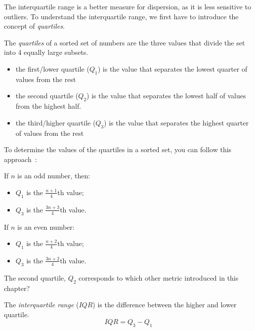 The interquartile range is a better measure for dispersion, as it is less sensitive to outliers.
To understand the interquartile range, we first have to introduce the concept of \emph{quartiles}.

\begin{definition}[Quartiles]
    The \emph{quartiles} of a sorted set of numbers are the three values that divide the set into 4 equally large subsets.
    
    \begin{itemize}
        \item the first/lower quartile ($Q_{1}$) is the value that separates the lowest quarter of values from the rest
        \item the second quartile ($Q_{2}$) is the value that separates the lowest half of values from the highest half.
        \item the third/higher quartile ($Q_{3}$) is the value that separates the highest quarter of values from the rest
    \end{itemize}
\end{definition}

To determine the values of the quartiles in a sorted set, you can follow this approach~\autocite{Moore2002}:

If $n$ is an odd number, then:
\begin{itemize}
    \item $Q_{1}$ is the $\frac{n+1}{4}$th value;
    \item $Q_{3}$ is the $\frac{3n+3}{4}$th value.
\end{itemize}

If $n$ is an even number:
\begin{itemize}
    \item $Q_{1}$ is the $\frac{n+2}{4}$th value;
    \item $Q_{3}$ is the $\frac{3n+2}{4}$th value.
\end{itemize}

\begin{exercise}
    The second quartile, $Q_2$ corresponds to which other metric introduced in this chapter?
\end{exercise}

\begin{definition}
    The \emph{interquartile range} ($IQR$) is the difference between the higher and lower quartile.
    \begin{equation}
    IQR = Q_3 - Q_1
    \end{equation}
\end{definition}

